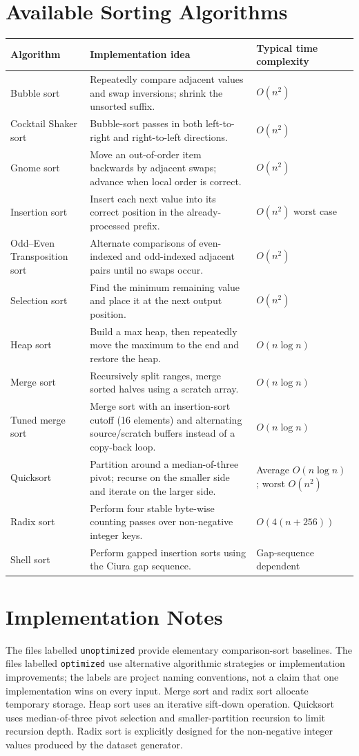 \documentclass[12pt,a4paper,oneside]{report}
\begin{document}
\section{Available Sorting Algorithms}
\begin{longtable}{p{}p{}p{}}
\toprule\textbf{Algorithm} & \textbf{Implementation idea} & \textbf{Typical time complexity}\\\midrule
Bubble sort & Repeatedly compare adjacent values and swap inversions; shrink the unsorted suffix. & $O(n^2)$\\
Cocktail Shaker sort & Bubble-sort passes in both left-to-right and right-to-left directions. & $O(n^2)$\\
Gnome sort & Move an out-of-order item backwards by adjacent swaps; advance when local order is correct. & $O(n^2)$\\
Insertion sort & Insert each next value into its correct position in the already-processed prefix. & $O(n^2)$ worst case\\
Odd--Even Transposition sort & Alternate comparisons of even-indexed and odd-indexed adjacent pairs until no swaps occur. & $O(n^2)$\\
Selection sort & Find the minimum remaining value and place it at the next output position. & $O(n^2)$\\
Heap sort & Build a max heap, then repeatedly move the maximum to the end and restore the heap. & $O(n\log n)$\\
Merge sort & Recursively split ranges, merge sorted halves using a scratch array. & $O(n\log n)$\\
Tuned merge sort & Merge sort with an insertion-sort cutoff (16 elements) and alternating source/scratch buffers instead of a copy-back loop. & $O(n\log n)$\\
Quicksort & Partition around a median-of-three pivot; recurse on the smaller side and iterate on the larger side. & Average $O(n\log n)$; worst $O(n^2)$\\
Radix sort & Perform four stable byte-wise counting passes over non-negative integer keys. & $O(4(n+256))$\\
Shell sort & Perform gapped insertion sorts using the Ciura gap sequence. & Gap-sequence dependent\\
\bottomrule\end{longtable}
\section{Implementation Notes}
The files labelled \texttt{unoptimized} provide elementary comparison-sort baselines. The files labelled \texttt{optimized} use alternative algorithmic strategies or implementation improvements; the labels are project naming conventions, not a claim that one implementation wins on every input. Merge sort and radix sort allocate temporary storage. Heap sort uses an iterative sift-down operation. Quicksort uses median-of-three pivot selection and smaller-partition recursion to limit recursion depth. Radix sort is explicitly designed for the non-negative integer values produced by the dataset generator.
\end{document}
